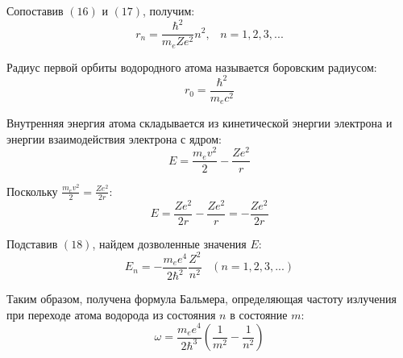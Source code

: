 \documentclass{article}
\begin{document}
	Сопоставив $(16)$ и $(17)$, получим:
	\begin{equation}
		r_n = \frac{\hbar^2}{m_eZe^2}n^2,\;\;\;n=1,2,3,...
	\end{equation}

	Радиус первой орбиты водородного атома называется боровским радиусом:
	\begin{equation}
		r_0 = \frac{\hbar^2}{m_e c^2}
	\end{equation}

	Внутренняя энергия атома складывается из кинетической энергии электрона и энергии взаимодействия электрона с ядром:
	\begin{equation}
		E = \frac{m_ev^2}{2} - \frac{Ze^2}{r}
	\end{equation}

	Поскольку $\frac{m_e v^2}{2}=\frac{Z e^2}{2r}$:
	\begin{equation}
		E=\frac{Ze^2}{2r} - \frac{Ze^2}{r} = -\frac{Ze^2}{2r}
	\end{equation}

	Подставив $(18)$, найдем дозволенные значения $E$:
	\begin{equation}
		E_n=-\frac{m_e e^4}{2\hbar^2}\frac{Z^2}{n^2}\;\;\;(n=1,2,3,...)
	\end{equation}

	Таким образом, получена формула Бальмера, определяющая частоту излучения при переходе атома водорода из состояния $n$ в состояние $m$:
	\begin{equation}
		\omega = \frac{m_e e^4}{2\hbar^3}(\frac{1}{m^2}-\frac{1}{n^2})
	\end{equation}







	
\end{document}
